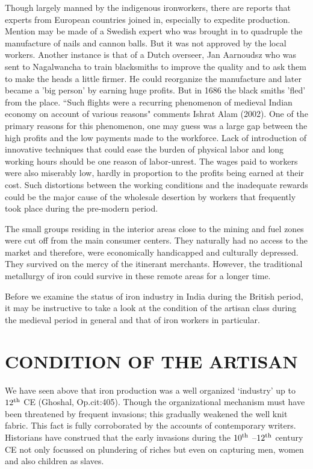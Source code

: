 Though largely manned by the indigenous ironworkers, there are reports that experts from European countries joined in, especially to expedite production. Mention may be made of a Swedish expert who was brought in to quadruple the manufacture of nails and cannon balls. But it was not approved by the local workers. Another instance is that of a Dutch overseer, Jan Aarnoudsz who was sent to Nagalwancha to train blacksmiths to improve the quality and to ask them to make the heads a little firmer. He could reorganize the manufacture and later became a 'big person' by earning huge profits. But in 1686 the black smiths 'fled' from the place. “Such flights were a recurring phenomenon of medieval Indian economy on account of various reasons" comments Ishrat Alam (2002). One of the primary reasons for this phenomenon, one may guess was a large gap between the high profits and the low payments made to the workforce. Lack of introduction of innovative techniques that could ease the burden of physical labor and long working hours should be one reason of labor-unrest. The wages paid to workers were also miserably low, hardly in proportion to the profits being earned at their cost. Such distortions between the working conditions and the inadequate rewards could be the major cause of the wholesale desertion by workers that frequently took place during the pre-modern period.  

The small groups residing in the interior areas close to the mining and fuel zones were cut off from the main consumer centers. They naturally had no access to the market and therefore, were economically handicapped and culturally depressed. They survived on the mercy of the itinerant merchants. However, the traditional metallurgy of iron could survive in these remote areas for a longer time.

Before we examine the status of iron industry in India during the British period, it may be instructive to take a look at the condition of the artisan class during the medieval period in general and that of iron workers in particular. 

\section*{CONDITION OF THE ARTISAN}\label{section-4}

We have seen above that iron production was a well organized ‘industry’ up to $12^{\rm th}$ CE (Ghoshal, Op.cit:405). Though the organizational mechanism must have been threatened by frequent invasions; this gradually weakened the well knit fabric. This fact is fully corroborated by the accounts of contemporary writers. Historians have construed that the early invasions during the $10^{\rm th}$ –$12^{\rm th}$ century CE not only focussed on plundering of riches but even on capturing men, women and also children as slaves. 

